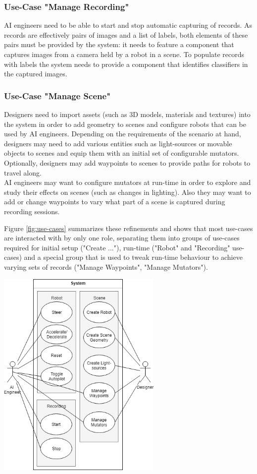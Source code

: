 \subsubsection{Use-Case "Manage Recording"}
\acs{AI} engineers need to be able to start and stop automatic capturing of records. As records are effectively pairs of images and a list of labels, both elements of these pairs must be provided by the system: it needs to feature a component that captures images from a camera held by a robot in a scene. To populate records with labels the system needs to provide a component that identifies classifiers in the captured images.

\subsubsection{Use-Case "Manage Scene"}
Designers need to import assets (such as 3D models, materials and textures) into the system in order to add geometry to scenes and configure robots that can be used by \acs{AI} engineers. Depending on the requirements of the scenario at hand, designers may need to add various entities such as light-sources or movable objects to scenes and equip them with an initial set of configurable mutators. Optionally, designers may add waypoints to scenes to provide paths for robots to travel along.\\
\acs{AI} engineers may want to configure mutators at run-time in order to explore and study their effects on scenes (such as changes in lighting). Also they may want to add or change waypoints to vary what part of a scene is captured during recording sessions.

Figure \ref{fig:use-cases} summarizes these refinements and shows that most use-cases are interacted with by only one role, separating them into groups of use-cases required for initial setup ("Create ..."), run-time ("Robot" and "Recording" use-cases) and a special group that is used to tweak run-time behaviour to achieve varying sets of records ("Manage Waypoints", "Manage Mutators"). 
\begin{center}
\noindent\includegraphics[width=8cm]{tex/img/ch04/UseCases_Fine_01.png}
\label{fig:use-cases}
\end{center}
\clearpage

